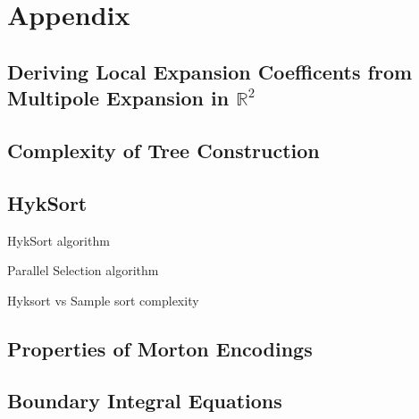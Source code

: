 \chapter{Appendix}

\section{Deriving Local Expansion Coefficents from Multipole Expansion in $\mathbb{R}^2$}\label{app:a_1_fmm_algorithm}

\section{Complexity of Tree Construction}\label{app:a_2_complexity_tree_construction}


\section{HykSort}\label{app:a_3:hyksort}

HykSort algorithm

Parallel Selection algorithm


Hyksort vs Sample sort complexity

\section{Properties of Morton Encodings}\label{app:a_4:morton}

\section{Boundary Integral Equations}\label{app:a_5:bie}